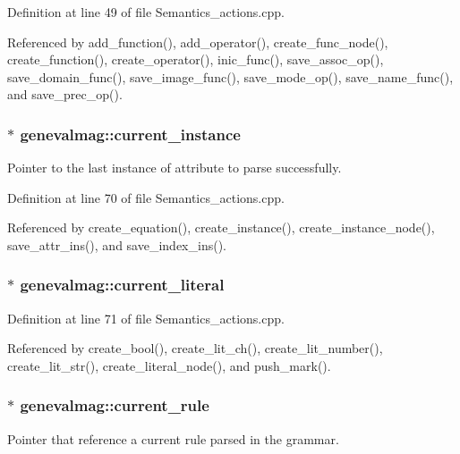 Definition at line 49 of file Semantics\_\-actions.cpp.



Referenced by add\_\-function(), add\_\-operator(), create\_\-func\_\-node(), create\_\-function(), create\_\-operator(), inic\_\-func(), save\_\-assoc\_\-op(), save\_\-domain\_\-func(), save\_\-image\_\-func(), save\_\-mode\_\-op(), save\_\-name\_\-func(), and save\_\-prec\_\-op().

\hypertarget{namespacegenevalmag_a4e01071642cc57ba91fe84d929195c7c}{
\subsubsection[{current\_\-instance}]{$\ast$ {\bf genevalmag::current\_\-instance}}}
\label{namespacegenevalmag_a4e01071642cc57ba91fe84d929195c7c}
Pointer to the last instance of attribute to parse successfully. 

Definition at line 70 of file Semantics\_\-actions.cpp.



Referenced by create\_\-equation(), create\_\-instance(), create\_\-instance\_\-node(), save\_\-attr\_\-ins(), and save\_\-index\_\-ins().

\hypertarget{namespacegenevalmag_a09a13d15a03643602e801cf36685ede0}{
\subsubsection[{current\_\-literal}]{$\ast$ {\bf genevalmag::current\_\-literal}}}
\label{namespacegenevalmag_a09a13d15a03643602e801cf36685ede0}


Definition at line 71 of file Semantics\_\-actions.cpp.



Referenced by create\_\-bool(), create\_\-lit\_\-ch(), create\_\-lit\_\-number(), create\_\-lit\_\-str(), create\_\-literal\_\-node(), and push\_\-mark().

\hypertarget{namespacegenevalmag_afc4896526f13792a5f56fa1c254759d4}{
\subsubsection[{current\_\-rule}]{$\ast$ {\bf genevalmag::current\_\-rule}}}
\label{namespacegenevalmag_afc4896526f13792a5f56fa1c254759d4}
Pointer that reference a current rule parsed in the grammar. 

